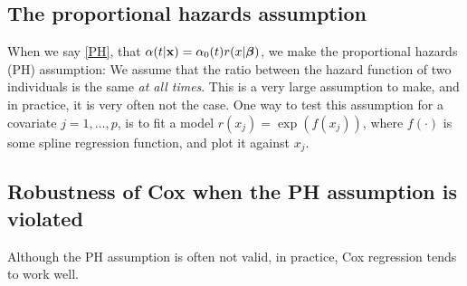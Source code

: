 

\subsection{The proportional hazards assumption}
When we say \eqref{PH}, that $\alpha(t|\mathbf{x})=\alpha_0(t)r(x|\boldsymbol{\beta})$, we make the proportional hazards (PH) assumption: We assume that the ratio between the hazard function of two individuals is the same \textit{at all times}. This is a very large assumption to make, and in practice, it is very often not the case. One way to test this assumption for a covariate $j=1,\ldots,p$, is to fit a model $r(x_j)=\exp(f(x_j))$, where $f(\cdot)$ is some spline regression function, and plot it against $x_j$.

\subsection{Robustness of Cox when the PH assumption is violated}
Although the PH assumption is often not valid, in practice, Cox regression tends to work well. 

